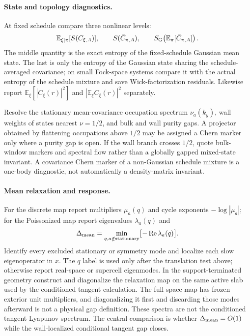 \documentclass[aps,prx,twocolumn,floatfix,nofootinbib,superscriptaddress,longbibliography]{revtex4-2}
\newcommand{\E}{\mathbb{E}}
\begin{document}
\paragraph*{State and topology diagnostics.}
At fixed schedule compare three nonlinear levels:
\begin{equation}
 \E_{\xi|\pi}[S(C_{\xi,A})],\qquad
 S(\bar C_{\pi,A}),\qquad
 S_{\rm G}\!\left(\E_\pi[\bar C_{\pi,A}]\right).
 \label{eq:three-mean-entropies}
\end{equation}
The middle quantity is the exact entropy of the fixed-schedule Gaussian mean state.  The
last is only the entropy of the Gaussian state sharing the schedule-averaged covariance;
on small Fock-space systems compare it with the actual entropy of the schedule mixture and
save Wick-factorization residuals.  Likewise report
$\E_\xi[|C_\xi(r)|^2]$ and $|\E_\xi C_\xi(r)|^2$ separately.

Resolve the stationary mean-covariance occupation spectrum $\nu_a(k_y)$, wall weights of
states nearest $\nu=1/2$, and bulk and wall purity gaps.  A projector obtained by flattening
occupations above $1/2$ may be assigned a Chern marker only where a purity gap is open.
If the wall branch crosses $1/2$, quote bulk-window markers and spectral flow rather than a
globally gapped mixed-state invariant.  A covariance Chern marker of a non-Gaussian
schedule mixture is a one-body diagnostic, not automatically a density-matrix invariant.

\paragraph*{Mean relaxation and response.}
For the discrete map report multipliers $\mu_a(q)$ and cycle exponents
$-\log|\mu_a|$; for the Poissonized map report eigenvalues $\lambda_a(q)$ and
\begin{equation}
 \Delta_{\rm mean}
 =\min_{q,a\notin{\rm stationary}}\bigl[-\Re\lambda_a(q)\bigr].
 \label{eq:mean-gap}
\end{equation}
Identify every excluded stationary or symmetry mode and localize each slow eigenoperator
in $x$.  The $q$ label is used only after the translation test above; otherwise report
real-space or supercell eigenmodes.  In the support-terminated geometry construct and
diagonalize the relaxation map on the same active slab used by the conditioned tangent
calculation.  The full-space map has frozen-exterior unit multipliers, and diagonalizing it
first and discarding those modes afterward is not a physical gap definition.  These spectra
are not the conditioned tangent Lyapunov spectrum.  The central
comparison is whether $\Delta_{\rm mean}=O(1)$ while the wall-localized conditional
tangent gap closes.
\end{document}
